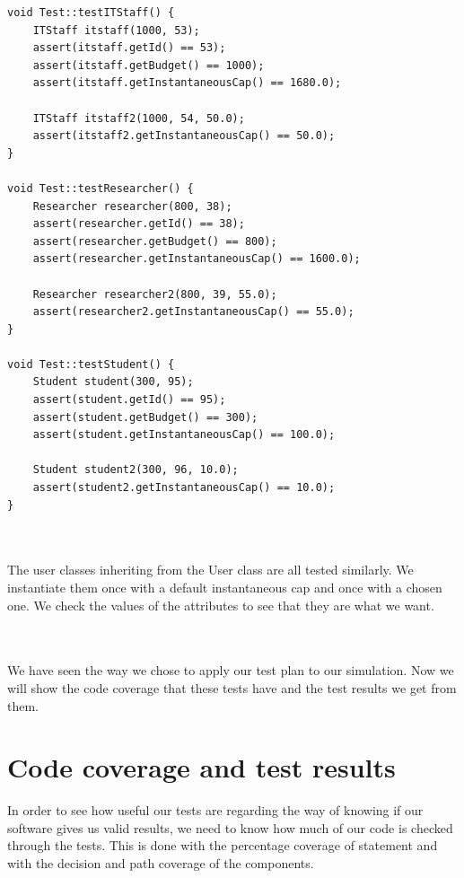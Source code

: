 \documentclass [10 pt, a4 paper]{report}
\begin{document}
\clearpage
\begin{lstlisting}[caption=test of the other User functions of the class Test, label={lst:code1}, frame=single]
void Test::testITStaff() {
	ITStaff itstaff(1000, 53);
	assert(itstaff.getId() == 53);
	assert(itstaff.getBudget() == 1000);
	assert(itstaff.getInstantaneousCap() == 1680.0);

	ITStaff itstaff2(1000, 54, 50.0);
	assert(itstaff2.getInstantaneousCap() == 50.0);
}

void Test::testResearcher() {
	Researcher researcher(800, 38);
	assert(researcher.getId() == 38);
	assert(researcher.getBudget() == 800);
	assert(researcher.getInstantaneousCap() == 1600.0);

	Researcher researcher2(800, 39, 55.0);
	assert(researcher2.getInstantaneousCap() == 55.0);
}

void Test::testStudent() {
	Student student(300, 95);
	assert(student.getId() == 95);
	assert(student.getBudget() == 300);
	assert(student.getInstantaneousCap() == 100.0);

	Student student2(300, 96, 10.0);
	assert(student2.getInstantaneousCap() == 10.0);
}
\end{lstlisting}

\noindent
\\ \\ 
The user classes inheriting from the User class are all tested similarly. We instantiate them once with a default instantaneous cap and once with a chosen one. We check the values of the attributes to see that they are what we want.



\noindent
\\ \\ 
We have seen the way we chose to apply our test plan to our simulation. Now we will show the code coverage that these tests have and the test results we get from them.






\chapter{Code coverage and test results}

In order to see how useful our tests are regarding the way of knowing if our software gives us valid results, we need to know how much of our code is checked through the tests. This is done with the percentage coverage of statement and with the decision and path coverage of the components.
\end{document}
